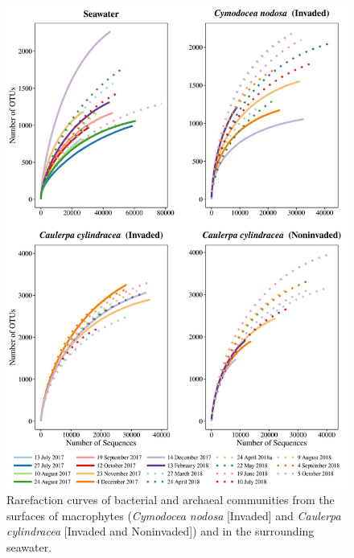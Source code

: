 \documentclass[12pt,]{article}
\begin{document}
\begin{figure}[H]

{\centering \includegraphics[width=0.85\linewidth]{../results/figures/rarefaction} 

}

\caption{Rarefaction curves of bacterial and archaeal communities from the surfaces of macrophytes (\textit{Cymodocea nodosa} [Invaded] and \textit{Caulerpa cylindracea} [Invaded and Noninvaded]) and in the surrounding seawater.\label{rarefaction}}\label{fig:unnamed-chunk-1}
\end{figure}
\end{document}
